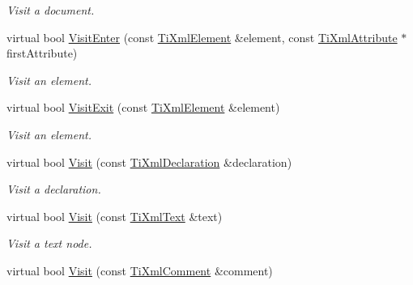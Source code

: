 \begin{DoxyCompactItemize}
\begin{DoxyCompactList}\small\item\em Visit a document. \end{DoxyCompactList}\item 
\hypertarget{class_ti_xml_printer_a0c5e7bf8622838417a0d0bfb8f433854}{virtual bool \hyperlink{class_ti_xml_printer_a0c5e7bf8622838417a0d0bfb8f433854}{Visit\+Enter} (const \hyperlink{class_ti_xml_element}{Ti\+Xml\+Element} \&element, const \hyperlink{class_ti_xml_attribute}{Ti\+Xml\+Attribute} $\ast$first\+Attribute)}\label{class_ti_xml_printer_a0c5e7bf8622838417a0d0bfb8f433854}

\begin{DoxyCompactList}\small\item\em Visit an element. \end{DoxyCompactList}\item 
\hypertarget{class_ti_xml_printer_a1853cf2f6e63ad4b4232b4835e0acaf0}{virtual bool \hyperlink{class_ti_xml_printer_a1853cf2f6e63ad4b4232b4835e0acaf0}{Visit\+Exit} (const \hyperlink{class_ti_xml_element}{Ti\+Xml\+Element} \&element)}\label{class_ti_xml_printer_a1853cf2f6e63ad4b4232b4835e0acaf0}

\begin{DoxyCompactList}\small\item\em Visit an element. \end{DoxyCompactList}\item 
\hypertarget{class_ti_xml_printer_ace1b14d33eede2575c0743e2350f6a38}{virtual bool \hyperlink{class_ti_xml_printer_ace1b14d33eede2575c0743e2350f6a38}{Visit} (const \hyperlink{class_ti_xml_declaration}{Ti\+Xml\+Declaration} \&declaration)}\label{class_ti_xml_printer_ace1b14d33eede2575c0743e2350f6a38}

\begin{DoxyCompactList}\small\item\em Visit a declaration. \end{DoxyCompactList}\item 
\hypertarget{class_ti_xml_printer_a711e7d65d4af9ec70977568d2451fb1c}{virtual bool \hyperlink{class_ti_xml_printer_a711e7d65d4af9ec70977568d2451fb1c}{Visit} (const \hyperlink{class_ti_xml_text}{Ti\+Xml\+Text} \&text)}\label{class_ti_xml_printer_a711e7d65d4af9ec70977568d2451fb1c}

\begin{DoxyCompactList}\small\item\em Visit a text node. \end{DoxyCompactList}\item 
\hypertarget{class_ti_xml_printer_a83c13d6b980064b30f989f9a35498979}{virtual bool \hyperlink{class_ti_xml_printer_a83c13d6b980064b30f989f9a35498979}{Visit} (const \hyperlink{class_ti_xml_comment}{Ti\+Xml\+Comment} \&comment)}\label{class_ti_xml_printer_a83c13d6b980064b30f989f9a35498979}


\end{DoxyCompactItemize}
